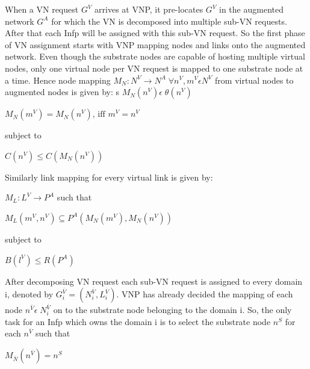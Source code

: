 \documentclass[article,dr=phil,type=msc ,colorback,accentcolor=tud4b]{tudthesis}
\begin{document}
\begin{enumerate}[label=(\Alph*)]
When a VN request $G^{V}$ arrives at VNP, it pre-locates $G^{V}$ in the augmented network $G^{A}$ for which the VN is decomposed into multiple sub-VN requests. After that each Infp will be assigned with this sub-VN request. So the first phase of VN assignment starts with VNP mapping nodes and links onto the augmented network. Even though the substrate nodes are capable of hosting multiple virtual nodes, only one virtual node per VN request is mapped to one substrate node at a time. Hence node mapping $M_{N} : N^{V} \rightarrow N^{A}\;  \forall n^{V}, m^{V} \epsilon N^{V}$ from virtual nodes to augmented nodes is given by: \newline
s
\hspace*{5cm}$M_{N}(n^{V}) \epsilon \;\theta(n^{V})$

\hspace*{5cm}$M_{N}(m^{V}) = M_{N}(n^{V}) \text{, iff } m^{V}=n^{V}$

\hspace*{4cm}subject to 

\hspace*{6cm}$C(n^{V})  \leq C(M_{N}(n^{V}))$ \newline

Similarly link mapping for every virtual link is given by: \newline 

\hspace*{5cm} $M_{L} : L^{V} \rightarrow P^{A}$ such that

\hspace*{5cm} $M_{L}(m^{V}, n^{V}) \subseteq P^{A}(M_{N}(m^{V}), M_{N}(n^{V}))$

\hspace*{4cm} subject to
 
\hspace*{5cm} $B(l^{V}) \leq R(P^{A})$ \newline

After decomposing VN request each sub-VN request is assigned to every domain i, denoted by $G^{\overline{V}}_{i} = (N^{\overline{V}}_{i}, L^{\overline{V}}_{i})$. VNP has already decided the mapping of each node $n^{\overline{V}} \epsilon \; N^{\overline{V}}_{i}$ on to the substrate node belonging to the domain i. So, the only task for an Infp which owns the domain i is to select the substrate node $n^{S}$ for each $n^{\overline{V}}$ such that \newline


\hspace*{5cm}$M_{\overline{N}}(n^{\overline{V}}) = n^{S}$


\end{enumerate}
\end{document}
